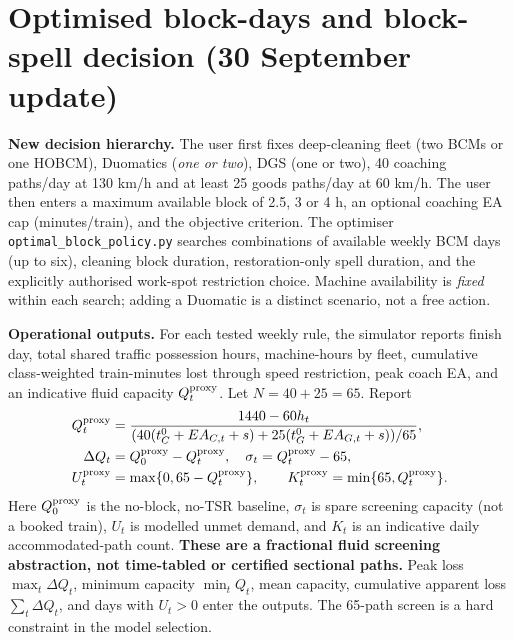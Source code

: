 \documentclass[10pt,a4paper]{article}
\begin{document}
\section{Optimised block-days and block-spell decision (30 September update)}
\textbf{New decision hierarchy.} The user first fixes deep-cleaning fleet (two BCMs or one HOBCM), Duomatics (\emph{one or two}), DGS (one or two), 40 coaching paths/day at 130 km/h and at least 25 goods paths/day at 60 km/h. The user then enters a maximum available block of 2.5, 3 or 4 h, an optional coaching EA cap (minutes/train), and the objective criterion. The optimiser \texttt{optimal\_block\_policy.py} searches combinations of available weekly BCM days (up to six), cleaning block duration, restoration-only spell duration, and the explicitly authorised work-spot restriction choice. Machine availability is \emph{fixed} within each search; adding a Duomatic is a distinct scenario, not a free action.

\textbf{Operational outputs.} For each tested weekly rule, the simulator reports finish day, total shared traffic possession hours, machine-hours by fleet, cumulative class-weighted train-minutes lost through speed restriction, peak coach EA, and an indicative fluid capacity $Q_t^{\rm proxy}$. Let $N=40+25=65$. Report
\begin{align}
Q_t^{\rm proxy}&=\frac{1440-60h_t}{(40(t^0_C+EA_{C,t}+s)+25(t^0_G+EA_{G,t}+s))/65},\\
\Delta Q_t&=Q_0^{\rm proxy}-Q_t^{\rm proxy},\quad \sigma_t=Q_t^{\rm proxy}-65,\\
U_t^{\rm proxy}&=\max\{0,65-Q_t^{\rm proxy}\},\qquad
K_t^{\rm proxy}=\min\{65,Q_t^{\rm proxy}\}.
\end{align}
Here $Q_0^{\rm proxy}$ is the no-block, no-TSR baseline, $\sigma_t$ is spare screening capacity (not a booked train), $U_t$ is modelled unmet demand, and $K_t$ is an indicative daily accommodated-path count. \textbf{These are a fractional fluid screening abstraction, not time-tabled or certified sectional paths.} Peak loss $\max_t \Delta Q_t$, minimum capacity $\min_t Q_t$, mean capacity, cumulative apparent loss $\sum_t \Delta Q_t$, and days with $U_t>0$ enter the outputs. The 65-path screen is a hard constraint in the model selection.
\end{document}
